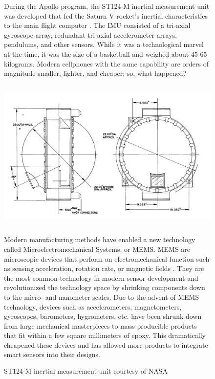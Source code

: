 \begin{figure}
    \begin{fitbox}[frametitle=Aside: MEMS Technology]
        During the Apollo program, the ST124-M inertial measurement unit was developed that fed the Saturn V rocket's inertial characteristics to the main flight computer \cite{Thomason:1965}.
        The IMU consisted of a tri-axial gyroscope array, redundant tri-axial accelerometer arrays, pendulums, and other sensors.
        While it was a technological marvel at the time, it was the size of a basketball and weighed about 45-65 kilograms.
        Modern cellphones with the same capability are orders of magnitude smaller, lighter, and cheaper; so, what happened?

        \begin{center}
            \includegraphics[height=3in]{images/background/Apollo_IMU_exhibit.jpg}
            \caption[ST124-M Outline]{ST124-M inertial measurement unit courtesy of NASA \cite{Thomason:1965}}
        \end{center}

        Modern manufacturing methods have enabled a new technology called Microelectromechanical Systems, or MEMS.
        MEMS are microscopic devices that perform an electromechanical function such as sensing acceleration, rotation rate, or magnetic fields \cite{MEMS:2023}.
        They are the most common technology in modern sensor development and revolutionized the technology space by shrinking components down to the micro- and nanometer scales.
        Due to the advent of MEMS technology, devices such as accelerometers, magnetometers, gyroscopes, barometers, hygrometers, etc. have been shrunk down from large mechanical masterpieces to mass-producible products that fit within a few square millimeters of epoxy.
        This dramatically cheapened these devices and has allowed more products to integrate smart sensors into their designs.
    \end{fitbox}
\end{figure}

